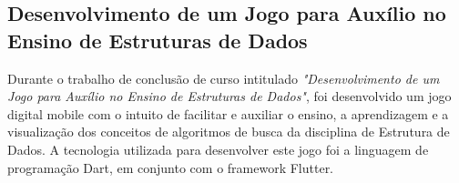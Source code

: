 \subsection{Desenvolvimento de um Jogo para Auxílio no Ensino de Estruturas de Dados}

Durante o trabalho de conclusão de curso intitulado \textit{"Desenvolvimento de um Jogo para Auxílio no Ensino de Estruturas de Dados"}, foi desenvolvido um jogo digital mobile com o intuito de facilitar e auxiliar o ensino, a aprendizagem e a visualização dos conceitos de algoritmos de busca da disciplina de Estrutura de Dados. A tecnologia utilizada para desenvolver este jogo foi a linguagem de programação Dart, em conjunto com o framework Flutter. \cite{glatz2023desenvolvimento}




